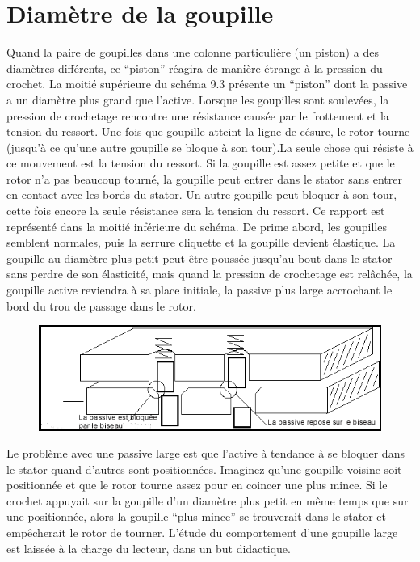 \documentclass[a4paper,french,11pt,twoside]{report}
\begin{document}
\section{Diamètre de la goupille}

Quand la paire de goupilles dans une colonne particulière (un piston) a des diamètres différents, ce \enquote{piston} réagira de manière étrange à la pression du crochet. La moitié supérieure du schéma 9.3 présente un \enquote{piston} dont la passive a un diamètre plus grand que l'active. Lorsque les goupilles sont soulevées, la pression de crochetage rencontre une résistance causée par le frottement et la tension du ressort. Une fois que goupille atteint la ligne de césure, le rotor tourne (jusqu'à ce qu'une autre goupille se bloque à son tour).La seule chose qui résiste à ce mouvement est la tension du ressort. Si la goupille est assez petite et que le rotor n'a pas beaucoup tourné, la goupille peut entrer dans le stator sans entrer en contact avec les bords du stator. Un autre goupille peut bloquer à son tour, cette fois encore la seule résistance sera la tension du ressort. Ce rapport est représenté dans la moitié inférieure du schéma. De prime abord, les goupilles semblent normales, puis la serrure cliquette et la goupille devient élastique. La goupille au diamètre plus petit peut être poussée jusqu'au bout dans le stator sans perdre de son élasticité, mais quand la pression de crochetage est relâchée, la goupille active reviendra à sa place initiale, la passive plus large accrochant le bord du trou de passage dans le rotor.

\begin{figure}[h] \begin{center}
        \includegraphics[width=16cm]{images/Image22}
        \caption{}
\end{center} \end{figure}

Le problème avec une passive large est que l'active à tendance à se bloquer dans le stator quand d'autres sont positionnées. Imaginez qu'une goupille voisine soit positionnée et que le rotor tourne assez pour en coincer une plus mince. Si le crochet appuyait sur la goupille d'un diamètre plus petit en même temps que sur une positionnée, alors la goupille \enquote{plus mince} se trouverait dans le stator et empêcherait le rotor de tourner. L'étude du comportement d'une goupille large est laissée à la charge du lecteur, dans un but didactique.
\end{document}
